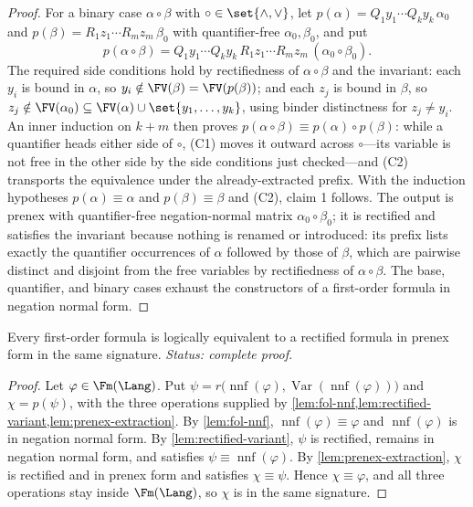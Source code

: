 \begin{proof}
For a binary case \(\alpha\circ\beta\) with
\(\circ\in\set{\land,\lor}\), let
\(p(\alpha)=Q_1y_1\cdots Q_ky_k\,\alpha_0\) and
\(p(\beta)=R_1z_1\cdots R_mz_m\,\beta_0\) with quantifier-free
\(\alpha_0,\beta_0\), and put
\[
 p(\alpha\circ\beta)=
 Q_1y_1\cdots Q_ky_k\,R_1z_1\cdots R_mz_m\,(\alpha_0\circ\beta_0).
\]
The required side conditions hold by rectifiedness of
\(\alpha\circ\beta\) and the invariant: each \(y_i\) is bound in
\(\alpha\), so \(y_i\notin\FV(\beta)=\FV(p(\beta))\); and each
\(z_j\) is bound in \(\beta\), so
\(z_j\notin\FV(\alpha_0)\subseteq\FV(\alpha)\cup\set{y_1,\ldots,y_k}\),
using binder distinctness for \(z_j\ne y_i\).  An inner induction on
\(k+m\) then proves
\(p(\alpha\circ\beta)\equiv p(\alpha)\circ p(\beta)\): while a
quantifier heads either side of \(\circ\), (C1) moves it outward across
\(\circ\)---its variable is not free in the other side by the side
conditions just checked---and (C2) transports the equivalence under the
already-extracted prefix.  With the induction hypotheses
\(p(\alpha)\equiv\alpha\) and \(p(\beta)\equiv\beta\) and (C2), claim 1
follows.  The output is prenex with quantifier-free negation-normal
matrix \(\alpha_0\circ\beta_0\); it is rectified and satisfies the
invariant because nothing is renamed or introduced: its prefix lists
exactly the quantifier occurrences of \(\alpha\) followed by those of
\(\beta\), which are pairwise distinct and disjoint from the free
variables by rectifiedness of \(\alpha\circ\beta\).  The base,
quantifier, and binary cases exhaust the constructors of a first-order
formula in negation normal form.
\end{proof}

\begin{theorem}
\label{thm:prenex-normal-form}
Every first-order formula is logically equivalent to a rectified formula in
prenex form in the same signature.
\textit{Status: complete proof.}
\end{theorem}
\begin{proof}
Let \(\varphi\in\Fm(\Lang)\).  Put
\(\psi=r\bigl(\operatorname{nnf}(\varphi),
\operatorname{Var}(\operatorname{nnf}(\varphi))\bigr)\) and
\(\chi=p(\psi)\), with the three operations supplied by
\cref{lem:fol-nnf,lem:rectified-variant,lem:prenex-extraction}.  By
\cref{lem:fol-nnf}, \(\operatorname{nnf}(\varphi)\equiv\varphi\) and
\(\operatorname{nnf}(\varphi)\) is in negation normal form.  By
\cref{lem:rectified-variant}, \(\psi\) is rectified, remains in negation
normal form, and satisfies \(\psi\equiv\operatorname{nnf}(\varphi)\).  By
\cref{lem:prenex-extraction}, \(\chi\) is rectified and in prenex form
and satisfies \(\chi\equiv\psi\).  Hence
\(\chi\equiv\varphi\), and all three operations stay inside
\(\Fm(\Lang)\), so \(\chi\) is in the same signature.
\end{proof}

